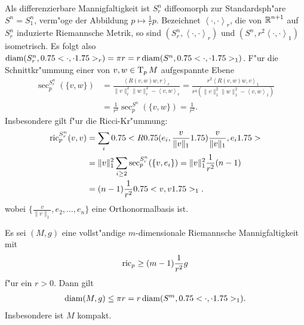Als differenzierbare Mannigfaltigkeit ist $S^n_r$ diffeomorph zur Standardsph"are $S^n = S^n_1$, verm"oge der Abbildung $p \mapsto \frac{1}{r}p$. Bezeichnet $\left<\cdot,\cdot\right>_r$, die von
$\operatorname{\mathbb{R}}^{n+1}$ auf $S^n_r$ induzierte Riemannsche Metrik, so sind $(S^n_r,\left<\cdot,\cdot\right>_r)$ und $(S^n,r^2\left<\cdot,\cdot\right>_1)$ isometrisch.
Es folgt also $\operatorname{diam}(S^n_r,0.75<\cdot,\cdot1.75>_r) = \pi r = r \operatorname{diam}(S^n,0.75<\cdot,\cdot1.75>_1)$.
F"ur die Schnittkr"ummung einer von $v,w \in \operatorname{T}_pM$ aufgespannte Ebene
\begin{align*}
  \sec_p^{S^n_r}(\{v,w\}) & =
  \frac{\left<R(v,w)w,r\right>_r}{\|v\|_r^2\|w\|_r^2-\left<v,w\right>_r}
  =
  \frac{r^2\left<R(v,w)w,v\right>_1}{r^4(\|v\|_1^2\|w\|_1^2-\left<v,w\right>_1)}\\
  & = \frac{1}{r^2} \sec_p^{S^n}(\{v,w\}) = \frac{1}{r^2}.
\end{align*}
Insbesondere gilt f"ur die Ricci-Kr"ummung:
\begin{align*}
  \operatorname{ric}_p^{S_r^n}(v,v) & = \sum_i 0.75<R0.75(e_i,\frac{v}{\|v\|_1}1.75)\frac{v}{\|v\|_1},e_i1.75>\\
  & = \|v\|_1^2\sum_{i \geq 2}\sec_p^{S^n_r}(\{v,e_i\}) = \|v\|_1^2 \frac{1}{r^2}(n-1)\\
  & = (n-1)\frac{1}{r^2}0.75<v,v1.75>_1.
\end{align*}
wobei $\{\frac{v}{\|v\|_1}, e_2, \ldots, e_n\}$ eine Orthonormalbasis ist.

\begin{Satz}
  Es sei $(M,g)$ eine vollst"andige $m$-dimensionale Riemannsche Mannigfaltigkeit mit 
  \begin{align*}
    \operatorname{ric}_p \geq (m-1) \frac{1}{r^2} g
  \end{align*}
  f"ur ein $r > 0$.
  Dann gilt
  \begin{align*}
    \operatorname{diam}(M,g) \leq \pi r = r \operatorname{diam}(S^m,0.75<\cdot,\cdot1.75>_1).
  \end{align*}
  Insbesondere ist $M$ kompakt.
\end{Satz}


